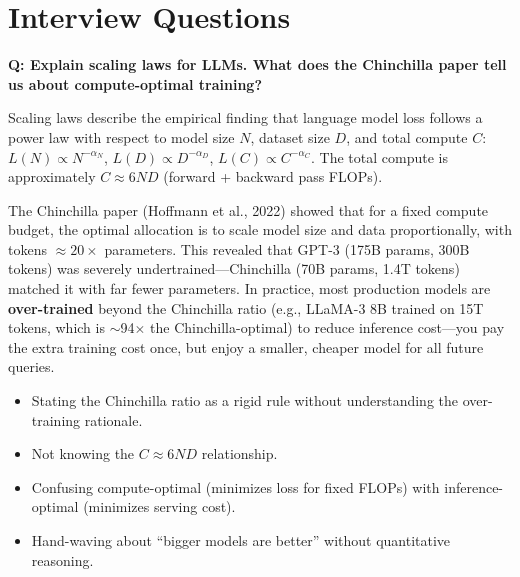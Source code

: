 \section{Interview Questions}
\label{sec:llm_icl_interview}

\begin{interviewq}
\textbf{Q: Explain scaling laws for LLMs. What does the Chinchilla paper
tell us about compute-optimal training?}

 \quad {} \quad
\badgefreq{\freqhigh}

\stronganswer
Scaling laws describe the empirical finding that language model loss follows
a power law with respect to model size $N$, dataset size $D$, and total
compute $C$: $L(N) \propto N^{-\alpha_N}$, $L(D) \propto D^{-\alpha_D}$,
$L(C) \propto C^{-\alpha_C}$.  The total compute is approximately
$C \approx 6ND$ (forward + backward pass FLOPs).

The Chinchilla paper (Hoffmann et al., 2022) showed that for a fixed compute
budget, the optimal allocation is to scale model size and data proportionally,
with tokens $\approx 20\times$ parameters.  This revealed that GPT-3 (175B
params, 300B tokens) was severely undertrained---Chinchilla (70B params, 1.4T
tokens) matched it with far fewer parameters.  In practice, most production
models are \textbf{over-trained} beyond the Chinchilla ratio (e.g., LLaMA-3 8B
trained on 15T tokens, which is $\sim$94$\times$ the Chinchilla-optimal) to
reduce inference cost---you pay the extra training cost once, but enjoy a
smaller, cheaper model for all future queries.

\redflags
\begin{itemize}
\item Stating the Chinchilla ratio as a rigid rule without understanding
  the over-training rationale.
\item Not knowing the $C \approx 6ND$ relationship.
\item Confusing compute-optimal (minimizes loss for fixed FLOPs) with
  inference-optimal (minimizes serving cost).
\item Hand-waving about ``bigger models are better'' without quantitative
  reasoning.
\end{itemize}



\end{interviewq}

